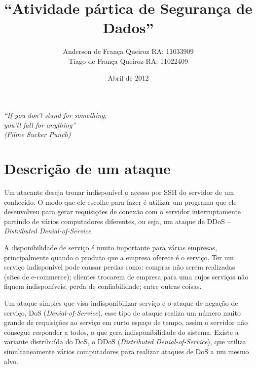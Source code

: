 \documentclass[12pt]{abnt}
\title{``Atividade pártica de Segurança de Dados''}
\author{Anderson de França Queiroz RA: 11033909\\
Tiago de França Queiroz RA: 11022409}
\date{Abril de 2012}
\begin{document}
\sloppy

\maketitle

\begin{titlepage}

  \vspace{6cm}

  \begin{flushleft}
    \sffamily\slshape
    ``If you don't stand for something,\\
	you'll fall for anything''\\
	(Filme Sucker Punch)
   
    \vspace{1cm}
    
    \end{flushleft}

\end{titlepage}

\tableofcontents
\clearpage

\chapter{Descrição de um ataque}

Um atacante deseja tronar indisponível o acesso por SSH do servidor de um conhecido. O modo que ele escolhe para fazer é utilizar
um programa que ele desenvolveu para gerar requisições de conexão com o servidor interruptamente partindo de vários computadores
diferentes, ou seja, um ataque de DDoS -- \textit{Distributed Denial-of-Service}.


A disponibilidade de serviço é muito importante para várias empresas, principalmente quando o produto que a empresa oferece é o serviço.
Ter um serviço indisponível pode causar perdas como: compras não serem realizadas (sites de e-commerce); clientes trocarem de empresa para uma cujos
serviços não fiquem indisponíveis; perda de confiabilidade; entre outras coisas.

Um ataque simples
que visa indisponibilizar serviço é o ataque de negação de serviço, DoS (\textit{Denial-of-Service}), 
esse tipo de ataque realiza um número muito grande
de requisições ao serviço em curto espaço de tempo, assim o servidor não consegue responder a todos, o que gera indisponibilidade do sistema.
Existe a variante distribuída do DoS, o DDoS (\textit{Distributed Denial-of-Service}), 
que utiliza simultaneamente vários computadores para realizar ataques de DoS a um mesmo alvo.
\end{document}
